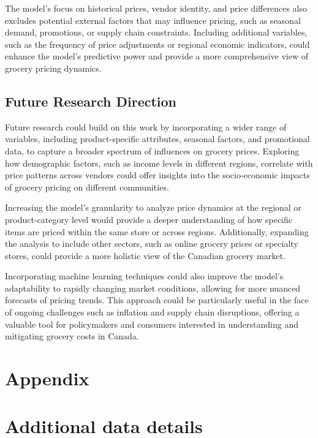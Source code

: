 \documentclass[
  letterpaper,
  DIV=11,
  numbers=noendperiod]{scrartcl}
\begin{document}
The model's focus on historical prices, vendor identity, and price
differences also excludes potential external factors that may influence
pricing, such as seasonal demand, promotions, or supply chain
constraints. Including additional variables, such as the frequency of
price adjustments or regional economic indicators, could enhance the
model's predictive power and provide a more comprehensive view of
grocery pricing dynamics.

\subsection{Future Research Direction}\label{future-research-direction}

Future research could build on this work by incorporating a wider range
of variables, including product-specific attributes, seasonal factors,
and promotional data, to capture a broader spectrum of influences on
grocery prices. Exploring how demographic factors, such as income levels
in different regions, correlate with price patterns across vendors could
offer insights into the socio-economic impacts of grocery pricing on
different communities.

Increasing the model's granularity to analyze price dynamics at the
regional or product-category level would provide a deeper understanding
of how specific items are priced within the same store or across
regions. Additionally, expanding the analysis to include other sectors,
such as online grocery prices or specialty stores, could provide a more
holistic view of the Canadian grocery market.

Incorporating machine learning techniques could also improve the model's
adaptability to rapidly changing market conditions, allowing for more
nuanced forecasts of pricing trends. This approach could be particularly
useful in the face of ongoing challenges such as inflation and supply
chain disruptions, offering a valuable tool for policymakers and
consumers interested in understanding and mitigating grocery costs in
Canada.

\newpage

\appendix

\section*{Appendix}\label{appendix}

\section{Additional data details}\label{additional-data-details}
\end{document}
